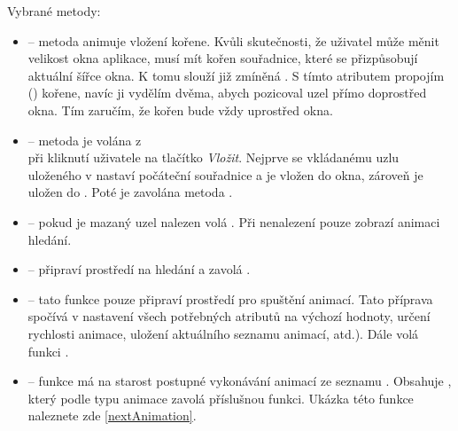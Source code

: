 \documentclass[
  biblatex=false,
  font=serif,
  glossaries=false,
  tables=false,
  theorems=false,
  index
]{kidiplom}
\begin{document}
\noindent Vybrané metody:
\begin{itemize}
\item {} -- metoda animuje vložení kořene. Kvůli skutečnosti, že uživatel může měnit velikost okna aplikace, musí mít kořen souřadnice, které se přizpůsobují aktuální šířce okna. K tomu slouží již zmíněná . S tímto atributem propojím  () kořene, navíc ji vydělím dvěma, abych pozicoval uzel přímo doprostřed okna. Tím zaručím, že kořen bude vždy uprostřed okna.

\item {} -- metoda je volána z \\ při kliknutí uživatele na tlačítko \textit{Vložit}. Nejprve se vkládanému uzlu uloženého v  nastaví počáteční souřadnice a je vložen do okna, zároveň je uložen do . Poté je zavolána metoda .

\item {} -- pokud je mazaný uzel nalezen volá . Při nenalezení pouze zobrazí animaci hledání. 

\item {} -- připraví prostředí na hledání a zavolá .

\item {} -- tato funkce pouze připraví prostředí pro spuštění animací. Tato příprava spočívá v nastavení všech potřebných atributů na výchozí hodnoty, určení rychlosti animace, uložení aktuálního seznamu animací, atd.). Dále volá funkci .

\item {} -- funkce má na starost postupné vykonávání animací ze seznamu . Obsahuje , který podle typu animace zavolá příslušnou funkci. Ukázka této funkce naleznete zde \ref{nextAnimation}.


\end{itemize}
\end{document}
